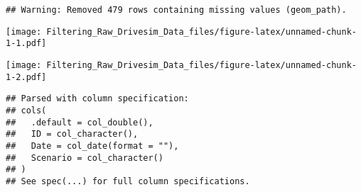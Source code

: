 \documentclass[]{article}
\newenvironment{Shaded}{\begin{snugshade}}{\end{snugshade}}
\newcommand{\CharTok}[1]{\textcolor[rgb]{0.31,0.60,0.02}{#1}}
\newcommand{\CommentTok}[1]{\textcolor[rgb]{0.56,0.35,0.01}{\textit{#1}}}
\newcommand{\DataTypeTok}[1]{\textcolor[rgb]{0.13,0.29,0.53}{#1}}
\newcommand{\DecValTok}[1]{\textcolor[rgb]{0.00,0.00,0.81}{#1}}
\newcommand{\KeywordTok}[1]{\textcolor[rgb]{0.13,0.29,0.53}{\textbf{#1}}}
\newcommand{\NormalTok}[1]{#1}
\newcommand{\OperatorTok}[1]{\textcolor[rgb]{0.81,0.36,0.00}{\textbf{#1}}}
\newcommand{\StringTok}[1]{\textcolor[rgb]{0.31,0.60,0.02}{#1}}
\begin{document}
\begin{verbatim}
## Warning: Removed 479 rows containing missing values (geom_path).
\end{verbatim}

\texttt{[image: Filtering\_Raw\_Drivesim\_Data\_files/figure-latex/unnamed-chunk-1-1.pdf]}

\begin{Shaded}
\end{Shaded}

\texttt{[image: Filtering\_Raw\_Drivesim\_Data\_files/figure-latex/unnamed-chunk-1-2.pdf]}

\begin{Shaded}
\end{Shaded}

\begin{verbatim}
## Parsed with column specification:
## cols(
##   .default = col_double(),
##   ID = col_character(),
##   Date = col_date(format = ""),
##   Scenario = col_character()
## )
## See spec(...) for full column specifications.
\end{verbatim}
\end{document}
